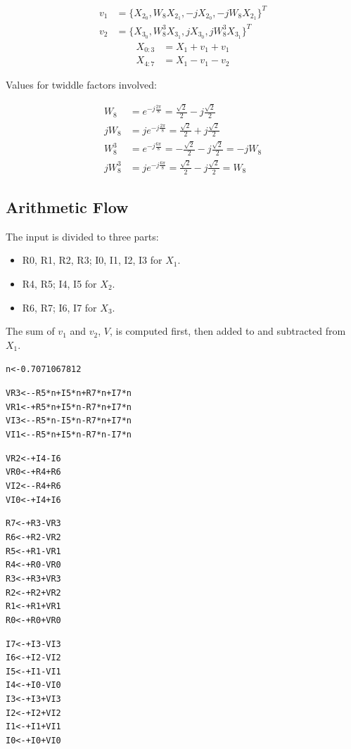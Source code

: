 \documentclass[a4paper]{report}
\begin{document}
\begin{align*}
v_1 &= \{X_{2_0}, W_8 X_{2_1}, -jX_{2_0}, -jW_8 X_{2_1}\}^T\\
v_2 &= \{X_{3_0}, W^3_8 X_{3_1}, jX_{3_0}, jW^3_8 X_{3_1}\}^T
\end{align*}
\begin{align*}
X_{0:3} &= X_1 + v_1 + v_1\\
X_{4:7} &= X_1 - v_1 - v_2
\end{align*}

	Values for twiddle factors involved:

\newcommand{\tsqft}{\frac{\sqrt{2}}{2}}
\[\begin{split}
	W_8 & = e^{-j\frac{2\pi}{8}} = \tsqft - j\tsqft\\
	jW_8 & = je^{-j\frac{2\pi}{8}} = \tsqft + j\tsqft\\
	W^3_8 & = e^{-j\frac{6\pi}{8}} = -\tsqft - j\tsqft = -jW_8\\
	jW^3_8 & = je^{-j\frac{6\pi}{8}} = \tsqft - j\tsqft = W_8
\end{split}\]

\subsection{Arithmetic Flow} \indent

	The input is divided to three parts: 

\begin{itemize}
	\item R0, R1, R2, R3; I0, I1, I2, I3 for $X_1$.
	\item R4, R5; I4, I5 for $X_2$.
	\item R6, R7; I6, I7 for $X_3$.
\end{itemize}

	The sum of $v_1$ and $v_2$, $V$, is computed first, then added to and subtracted from $X_1$.
\begin{alltt}
\centering
n   <- 0.7071067812            \,

VR3 <- -R5*n +I5*n +R7*n +I7*n \,
VR1 <- +R5*n +I5*n -R7*n +I7*n \,
VI3 <- -R5*n -I5*n -R7*n +I7*n \,
VI1 <- -R5*n +I5*n -R7*n -I7*n \,

VR2 <- +I4   -I6               \,
VR0 <- +R4   +R6               \,
VI2 <- -R4   +R6               \,
VI0 <- +I4   +I6               \,

R7  <- +R3 -VR3                \,
R6  <- +R2 -VR2                \,
R5  <- +R1 -VR1                \,
R4  <- +R0 -VR0                \,
R3  <- +R3 +VR3                \,
R2  <- +R2 +VR2                \,
R1  <- +R1 +VR1                \,
R0  <- +R0 +VR0                \,

I7  <- +I3 -VI3                \,
I6  <- +I2 -VI2                \,
I5  <- +I1 -VI1                \,
I4  <- +I0 -VI0                \,
I3  <- +I3 +VI3                \,
I2  <- +I2 +VI2                \,
I1  <- +I1 +VI1                \,
I0  <- +I0 +VI0                \,
\end{alltt}
\end{document}
